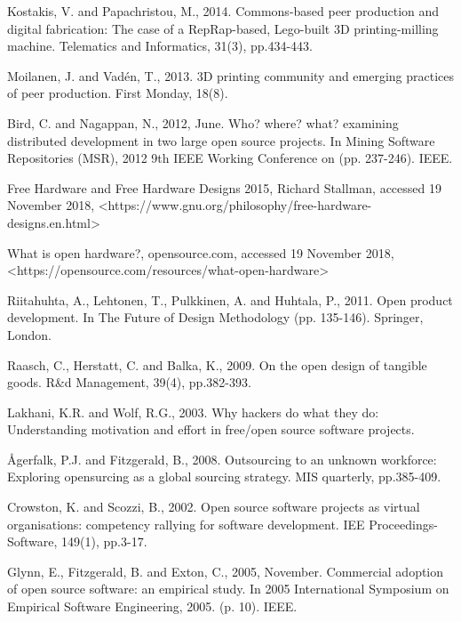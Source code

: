 Kostakis, V. and Papachristou, M., 2014. Commons-based peer production and digital fabrication: The case of a RepRap-based, Lego-built 3D printing-milling machine. Telematics and Informatics, 31(3), pp.434-443.

Moilanen, J. and Vadén, T., 2013. 3D printing community and emerging practices of peer production. First Monday, 18(8).





Bird, C. and Nagappan, N., 2012, June. Who? where? what? examining distributed development in two large open source projects. In Mining Software Repositories (MSR), 2012 9th IEEE Working Conference on (pp. 237-246). IEEE.



Free Hardware and Free Hardware Designs 2015, Richard Stallman, accessed 19 November 2018, <https://www.gnu.org/philosophy/free-hardware-designs.en.html>

 What is open hardware?,  opensource.com, accessed 19 November 2018,<https://opensource.com/resources/what-open-hardware>

Riitahuhta, A., Lehtonen, T., Pulkkinen, A. and Huhtala, P., 2011. Open product development. In The Future of Design Methodology (pp. 135-146). Springer, London.

Raasch, C., Herstatt, C. and Balka, K., 2009. On the open design of tangible goods. R&d Management, 39(4), pp.382-393.


Lakhani, K.R. and Wolf, R.G., 2003. Why hackers do what they do: Understanding motivation and effort in free/open source software projects.

Ågerfalk, P.J. and Fitzgerald, B., 2008. Outsourcing to an unknown workforce: Exploring opensurcing as a global sourcing strategy. MIS quarterly, pp.385-409.


Crowston, K. and Scozzi, B., 2002. Open source software projects as virtual organisations: competency rallying for software development. IEE Proceedings-Software, 149(1), pp.3-17.

Glynn, E., Fitzgerald, B. and Exton, C., 2005, November. Commercial adoption of open source software: an empirical study. In 2005 International Symposium on Empirical Software Engineering, 2005. (p. 10). IEEE.

